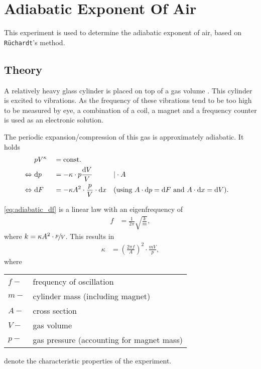 \chapter{Adiabatic Exponent Of Air}
This experiment is used to determine the adiabatic exponent of air, based on \texttt{Rüchardt}'s method.

\section{Theory}
A relatively heavy glass cylinder is placed on top of a gas volume .
This cylinder is excited to vibrations.
As the frequency of these vibrations tend to be too high to be measured by eye, a combination of a coil, a magnet and a frequency counter is used as an electronic solution.

The periodic expansion/compression of this gas is approximately adiabatic. It holds
\begin{align}
	&pV^{\kappa} &&= \text{const.}& \nonumber \\
	\Leftrightarrow\ &\text{d} p &&= -\kappa\cdot p\frac{\text{d} V}{V}&&|\cdot A \nonumber \\
	\Leftrightarrow\ &\text{d} F &&= -\kappa A^2\cdot\frac{p}{V}\cdot\text{d} x &&\text{(using $A\cdot \text{d} p=\text{d} F$ and $A\cdot\text{d} x=\text{d} V$).} \label{eq:adiabatic_df}
\end{align}

\autoref{eq:adiabatic_df} is a linear law with an eigenfrequency of
\begin{align*}
	f&=\frac{1}{2\pi}\sqrt{\frac{k}{m}},
\end{align*}
where $k=\kappa A^2\cdot\sfrac{p}{V}$.
This results in
\begin{align}\label{eq:kappa}
	\kappa&=\left(\frac{2\pi f}{A}\right)^2\cdot\frac{mV}{p},
\end{align}
where\par
\begin{tabular}{ll}
	$f-$	&	frequency of oscillation \\
	$m-$	&	cylinder mass (including magnet) \\
	$A-$	&	cross section \\
	$V-$	&	gas volume \\
	$p-$	&	gas pressure (accounting for magnet mass)\\
\end{tabular}\par
denote the characteristic properties of the experiment.
